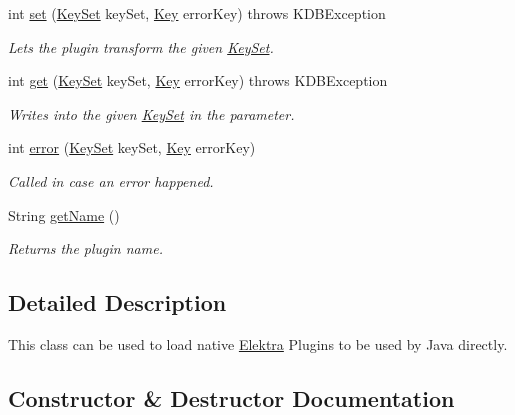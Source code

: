 \begin{DoxyCompactItemize}
int \hyperlink{classorg_1_1libelektra_1_1plugin_1_1NativePlugin_a9faeb1e6eb90a4c90681eeeb097eeb53}{set} (\hyperlink{classorg_1_1libelektra_1_1KeySet}{Key\+Set} key\+Set, \hyperlink{classorg_1_1libelektra_1_1Key}{Key} error\+Key)  throws K\+D\+B\+Exception 	
\begin{DoxyCompactList}\small\item\em Lets the plugin transform the given \hyperlink{classorg_1_1libelektra_1_1KeySet}{Key\+Set}. \end{DoxyCompactList}\item 
int \hyperlink{classorg_1_1libelektra_1_1plugin_1_1NativePlugin_a766870e5f26cab4d497ed7c2fbc4abd9}{get} (\hyperlink{classorg_1_1libelektra_1_1KeySet}{Key\+Set} key\+Set, \hyperlink{classorg_1_1libelektra_1_1Key}{Key} error\+Key)  throws K\+D\+B\+Exception 	
\begin{DoxyCompactList}\small\item\em Writes into the given \hyperlink{classorg_1_1libelektra_1_1KeySet}{Key\+Set} in the parameter. \end{DoxyCompactList}\item 
int \hyperlink{classorg_1_1libelektra_1_1plugin_1_1NativePlugin_a54c2753b1d17e14be39526a6ff02e34d}{error} (\hyperlink{classorg_1_1libelektra_1_1KeySet}{Key\+Set} key\+Set, \hyperlink{classorg_1_1libelektra_1_1Key}{Key} error\+Key)
\begin{DoxyCompactList}\small\item\em Called in case an error happened. \end{DoxyCompactList}\item 
String \hyperlink{classorg_1_1libelektra_1_1plugin_1_1NativePlugin_a606fc8f54bc810d874176103859976ab}{get\+Name} ()
\begin{DoxyCompactList}\small\item\em Returns the plugin name. \end{DoxyCompactList}\end{DoxyCompactItemize}


\subsection{Detailed Description}
This class can be used to load native \hyperlink{interfaceorg_1_1libelektra_1_1Elektra}{Elektra} Plugins to be used by Java directly. 

\subsection{Constructor \& Destructor Documentation}
\mbox{\label{classorg_1_1libelektra_1_1plugin_1_1NativePlugin_ad228084d20bd57c561e49ee755e9c751}} 
